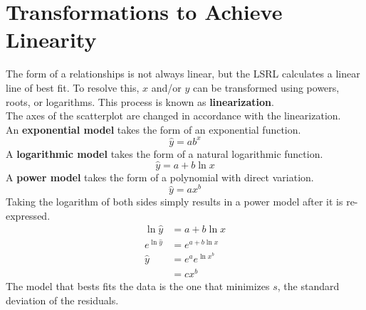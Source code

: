\documentclass[../AP_Statistics.tex]{subfiles}
\begin{document}
		\section{Transformations to Achieve Linearity}
			The form of a relationships is not always linear, but the LSRL calculates a linear line of best fit. To resolve this, $x$ and/or $y$ can be transformed using powers, roots, or logarithms. This process is known as \textbf{linearization}. \\
			The axes of the scatterplot are changed in accordance with the linearization. \\
			An \textbf{exponential model} takes the form of an exponential function.
			$$\hat{y} = ab^x$$
			A \textbf{logarithmic model} takes the form of a natural logarithmic function.
			$$\hat{y} = a + b\ln x$$
			A \textbf{power model} takes the form of a polynomial with direct variation.
			$$\hat{y} = ax^b$$
			Taking the logarithm of both sides simply results in a power model after it is re-expressed.
			\begin{align*}
				\ln \hat{y} &= a + b\ln x \\
				e^{\ln \hat{y}} &= e^{a + b\ln x} \\
				\hat{y} &= e^a e^{\ln x^b} \\
				&= cx^b
			\end{align*}
			The model that bests fits the data is the one that minimizes $s$, the standard deviation of the residuals.
\end{document}
